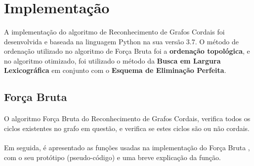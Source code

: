 \documentclass[a4paper, 11pt]{article}
\begin{document}
		\section{Implementação}
			\paragraph{} A implementação do algoritmo de Reconhecimento de Grafos Cordais foi desenvolvida e baseada na linguagem Python na sua versão 3.7. O método de ordenação utilizado no algoritmo de Força Bruta foi a \textbf{ordenação topológica}, e no algoritmo otimizado, foi utilizado o método da \textbf{Busca em Largura Lexicográfica} em conjunto com o \textbf{Esquema de Eliminação Perfeita}.
				
			\subsection{Força Bruta}
				\paragraph{} O algoritmo Força Bruta do Reconhecimento de Grafos Cordais, verifica todos os ciclos existentes no grafo em questão, e verifica se estes ciclos são ou não cordais.

				\paragraph{} Em seguida, é apresentado as funções usadas na implementação do Força Bruta , com o seu protótipo (pseudo-código) e uma breve explicação da função.
					
\end{document}
